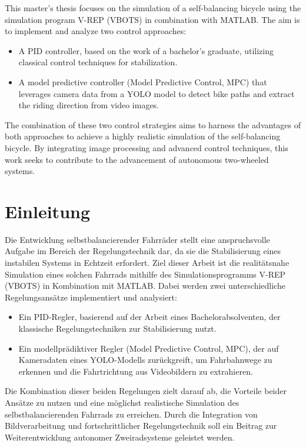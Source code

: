 \documentclass[11pt]{article}
\begin{document}
This master's thesis focuses on the simulation of a self-balancing bicycle using the simulation program V-REP (VBOTS) in combination with MATLAB. The aim is to implement and analyze two control approaches:

\begin{itemize}
  \item A PID controller, based on the work of a bachelor's graduate, utilizing classical control techniques for stabilization.
  \item A model predictive controller (Model Predictive Control, MPC) that leverages camera data from a YOLO model to detect bike paths and extract the riding direction from video images.
\end{itemize}

The combination of these two control strategies aims to harness the advantages of both approaches to achieve a highly realistic simulation of the self-balancing bicycle. By integrating image processing and advanced control techniques, this work seeks to contribute to the advancement of autonomous two-wheeled systems.

\newpage
\tableofcontents

\newpage
\twocolumn

\section{Einleitung}

Die Entwicklung selbstbalancierender Fahrräder stellt eine anspruchsvolle Aufgabe im Bereich der Regelungstechnik dar, da sie die Stabilisierung eines instabilen Systems in Echtzeit erfordert. Ziel dieser Arbeit ist die realitätsnahe Simulation eines solchen Fahrrads mithilfe des Simulationsprogramms V-REP (VBOTS) in Kombination mit MATLAB. Dabei werden zwei unterschiedliche Regelungsansätze implementiert und analysiert:

\begin{itemize}
  \item Ein PID-Regler, basierend auf der Arbeit eines Bachelorabsolventen, der klassische Regelungstechniken zur Stabilisierung nutzt.
  \item Ein modellprädiktiver Regler (Model Predictive Control, MPC), der auf Kameradaten eines YOLO-Modells zurückgreift, um Fahrbahnwege zu erkennen und die Fahrtrichtung aus Videobildern zu extrahieren.
\end{itemize}

Die Kombination dieser beiden Regelungen zielt darauf ab, die Vorteile beider Ansätze zu nutzen und eine möglichst realistische Simulation des selbstbalancierenden Fahrrads zu erreichen. Durch die Integration von Bildverarbeitung und fortschrittlicher Regelungstechnik soll ein Beitrag zur Weiterentwicklung autonomer Zweiradsysteme geleistet werden.
\end{document}
